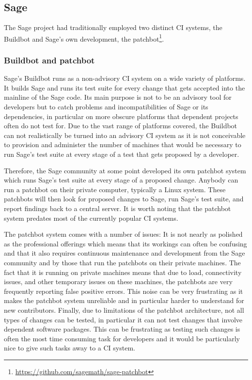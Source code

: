 \documentclass{deliverablereport}
\begin{document}
\subsection{Sage}

The Sage project had traditionally employed two distinct CI systems, the
Buildbot and Sage's own development, the
patchbot\footnote{\url{https://github.com/sagemath/sage-patchbot}}.

\subsubsection{Buildbot and patchbot}
Sage's Buildbot runs as a non-advisory CI system on a wide variety of
platforms. It builds Sage and runs its test suite for every change that gets
accepted into the mainline of the Sage code. Its main purpose is not to be an
advisory tool for developers but to catch problems and incompatibilities of
Sage or its dependencies, in particular on more obscure platforms that
dependent projects often do not test for. Due to the vast range of platforms
covered, the Buildbot can not realistically be turned into an advisory CI
system as it is not conceivable to provision and administer the number of
machines that would be necessary to run Sage's test suite at every stage of a
test that gets proposed by a developer.

Therefore, the Sage community at some point developed its own patchbot system
which runs Sage's test suite at every stage of a proposed change. Anybody can
run a patchbot on their private computer, typically a Linux system. These
patchbots will then look for proposed changes to Sage, run Sage's test suite,
and report findings back to a central server. It is worth noting that the
patchbot system predates most of the currently popular CI systems.

The patchbot system comes with a number of issues: It is not nearly as polished
as the professional offerings which means that its workings can often be
confusing and that it also requires continuous maintenance and development from
the Sage community and by those that run the patchbots on their private
machines. The fact that it is running on private machines means that due to
load, connectivity issues, and other temporary issues on these machines, the
patchbots are very frequently reporting false positive errors.
This noise can be very frustrating as it makes the patchbot system unreliable
and in particular harder to understand for new contributors. Finally, due to
limitations of the patchbot architecture, not all types of changes can be
tested, in particular it can not test changes that involve dependent software
packages. This can be frustrating as testing such changes is often the most
time consuming task for developers and it would be particularly nice to give
such tasks away to a CI system.
\end{document}
